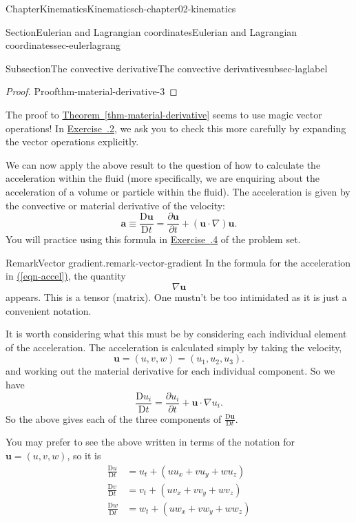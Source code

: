 \documentclass[oneside,10pt,]{book}
\newcommand{\xreffont}{\relax}
\numberwithin{equation}{section}
\newcommand{\DD}[2]{\frac{\mathrm{D}#1}{\mathrm{D}#2}}
\newcommand{\pd}[2]{\frac{\partial#1}{\partial#2}}
\newcommand{\bu}{\boldsymbol{u}}
\newcommand{\ba}{\boldsymbol{a}}
\newcommand{\amp}{&}
\begin{document}
\begin{chapterptx}{Chapter}{Kinematics}{}{Kinematics}{}{}{ch-chapter02-kinematics}
\begin{sectionptx}{Section}{Eulerian and Lagrangian coordinates}{}{Eulerian and Lagrangian coordinates}{}{}{sec-eulerlagrang}
\begin{subsectionptx}{Subsection}{The convective derivative}{}{The convective derivative}{}{}{subsec-laglabel}
\begin{proof}{Proof}{}{thm-material-derivative-3}
%
\end{proof}
The proof to \hyperref[thm-material-derivative]{Theorem~{\xreffont\ref{thm-material-derivative}}} seems to use magic vector operations! In \hyperlink{ex-material-derivative}{Exercise~{\xreffont 2.3.2}}, we ask you to check this more carefully by expanding the vector operations explicitly.%
\par
We can now apply the above result to the question of how to calculate the acceleration within the fluid (more specifically, we are enquiring about the acceleration of a volume or particle within the fluid). The acceleration is given by the convective or material derivative of the velocity:%
\begin{equation}
\ba \equiv \DD{\bu}{t} = \pd{\bu}{t} + (\bu \cdot \nabla) \bu.\label{eqn-accel}
\end{equation}
You will practice using this formula in \hyperlink{ex-eulerian-lagrangian2}{Exercise~{\xreffont 2.3.4}} of the problem set.%
\begin{remark}{Remark}{Vector gradient.}{remark-vector-gradient}%
In the formula for the acceleration in \hyperref[eqn-accel]{({\xreffont\ref{eqn-accel}})}, the quantity%
\begin{equation*}
\nabla \bu
\end{equation*}
appears. This is a tensor (matrix). One mustn't be too intimidated as it is just a convenient notation.%
\par
It is worth considering what this must be by considering each individual element of the acceleration. The acceleration is calculated simply by taking the velocity,%
\begin{equation*}
\bu = (u, v, w) = (u_1, u_2, u_3). 
\end{equation*}
and working out the material derivative for each individual component. So we have%
\begin{equation}
\DD{u_i}{t} = \pd{u_i}{t} + \bu \cdot \nabla u_i.\label{eqn-material-deriv-ui}
\end{equation}
So the above gives each of the three components of \(\DD{\bu}{t}\).%
\par
You may prefer to see the above written in terms of the notation for \(\bu = (u, v, w)\), so it is%
\begin{align*}
\DD{u}{t} \amp= u_t + (u u_x + v u_y + w u_z)\\
\DD{v}{t} \amp= v_t + (u v_x + v v_y + w v_z)\\
\DD{w}{t} \amp= w_t + (u w_x + v w_y + w w_z)
\end{align*}

\end{remark}
\end{subsectionptx}
\end{sectionptx}
\end{chapterptx}
\end{document}
